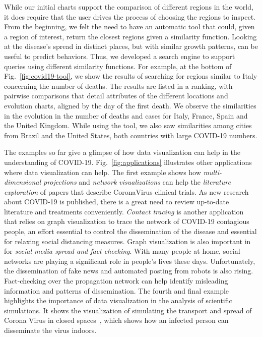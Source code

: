 \documentclass[10pt,journal,compsoc]{IEEEtran}
\newcommand{\cv}{COVID-19\xspace}
\begin{document}
While our initial charts support the comparison of different regions in the world, it does require that the user drives the process of choosing the regions to inspect. From the beginning, we felt the need to have an automatic tool that could, given a region of interest, return the closest regions given a similarity function. Looking at the disease's spread in distinct places, but with similar growth patterns, can be useful to predict behaviors. Thus, we developed a search engine to support queries using different similarity functions. For example, at the bottom of Fig.~\ref{fig:covid19-tool}, we show the results of searching for regions similar to Italy concerning the number of deaths. The results are listed in a ranking, with pairwise comparisons that detail attributes of the different locations and evolution charts, aligned by the day of the first death. We observe the similarities in the evolution in the number of deaths and cases for Italy, France, Spain and the United Kingdom. While using the tool, we also saw similarities among cities from Brazil and the United States, both countries with large \cv numbers.

The examples so far give a glimpse of how data visualization can help in the understanding of \cv. Fig.~\ref{fig:applications} illustrates other applications where data visualization can help. 
The first example shows how \emph{multi-dimensional projections} and \emph{network visualizations} can help the \emph{literature exploration} of papers that describe CoronaVirus clinical trials. As new research about \cv is published, there is a great need to review up-to-date literature and treatments conveniently. 
\emph{Contact tracing} is another application that relies on graph visualization to trace the network of \cv contagious people, an effort essential to control the dissemination of the disease and essential for relaxing social distancing measures. Graph visualization is also important in for \emph{social media spread and fact checking}. With many people at home, social networks are playing a significant role in people's lives these days. Unfortunately, the dissemination of fake news and automated posting from robots is also rising. Fact-checking over the propagation network can help identify misleading information and patterns of dissemination. The fourth and final example highlights the importance of data visualization in the analysis of scientific simulations. It shows the visualization of simulating the transport and spread of Corona Virus in closed spaces~\cite{VUORINEN2020}, which shows how an infected person can disseminate the virus indoors. 
\end{document}
